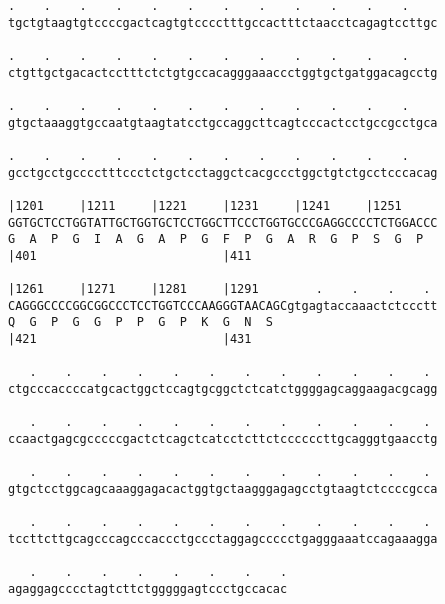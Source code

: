 \documentclass{article}
\begin{document}
\begin{Verbatim}
.    .    .    .    .    .    .    .    .    .    .    .    
tgctgtaagtgtccccgactcagtgtcccctttgccactttctaacctcagagtccttgc
                                                            
.    .    .    .    .    .    .    .    .    .    .    .    
ctgttgctgacactcctttctctgtgccacagggaaaccctggtgctgatggacagcctg
                                                            
.    .    .    .    .    .    .    .    .    .    .    .    
gtgctaaaggtgccaatgtaagtatcctgccaggcttcagtcccactcctgccgcctgca
                                                            
.    .    .    .    .    .    .    .    .    .    .    .    
gcctgcctgcccctttccctctgctcctaggctcacgccctggctgtctgcctcccacag
                                                            
|1201     |1211     |1221     |1231     |1241     |1251     
GGTGCTCCTGGTATTGCTGGTGCTCCTGGCTTCCCTGGTGCCCGAGGCCCCTCTGGACCC
G  A  P  G  I  A  G  A  P  G  F  P  G  A  R  G  P  S  G  P  
|401                          |411                          
  
|1261     |1271     |1281     |1291        .    .    .    . 
CAGGGCCCCGGCGGCCCTCCTGGTCCCAAGGGTAACAGCgtgagtaccaaactctccctt
Q  G  P  G  G  P  P  G  P  K  G  N  S                       
|421                          |431                          
  
   .    .    .    .    .    .    .    .    .    .    .    . 
ctgcccaccccatgcactggctccagtgcggctctcatctggggagcaggaagacgcagg
                                                            
   .    .    .    .    .    .    .    .    .    .    .    . 
ccaactgagcgcccccgactctcagctcatcctcttctccccccttgcagggtgaacctg
                                                            
   .    .    .    .    .    .    .    .    .    .    .    . 
gtgctcctggcagcaaaggagacactggtgctaagggagagcctgtaagtctccccgcca
                                                            
   .    .    .    .    .    .    .    .    .    .    .    . 
tccttcttgcagcccagcccaccctgccctaggagccccctgagggaaatccagaaagga
                                                            
   .    .    .    .    .    .    .    .
agaggagcccctagtcttctgggggagtccctgccacac
                                       
                                       
 

\end{Verbatim}
\end{document}
